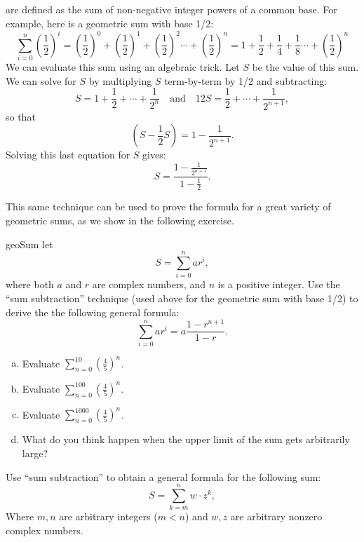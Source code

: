  are defined as the sum of non-negative integer powers of a common base.  For example, here is a geometric sum with base 1/2:
\[
\sum_{i=0}^{n}\left({\dfrac{1}{2}}\right)^i=\left({\dfrac{1}{2}}\right)^0+\left({\dfrac{1}{2}}\right)^1+\left({\dfrac{1}{2}}\right)^2\cdots +\left({\dfrac{1}{2}}\right)^n  = 1 + {\dfrac{1}{2}} + {\dfrac{1}{4}} + {\dfrac{1}{8}}\cdots +\left({\dfrac{1}{2}}\right)^n
\]
We can evaluate this sum using an algebraic trick.  Let $S$ be the value of this sum.  We can solve for $S$  by multiplying $S$ term-by-term by 1/2 and subtracting:
\[ S=1+\frac{1}{2}+ \cdots + \frac{1}{2^n} \quad \text{and} \quad
{1}{2}S=\frac{1}{2}+ \cdots + \frac{1}{2^{n+1}},
\]
so that
\[
\left(S - \frac{1}{2}S\right) = 1 - \frac{1}{2^{n+1}}.
\]
Solving this last equation for $S$ gives:
\[S=\dfrac{1 - \frac{1}{2^{n+1}}}{1-\frac{1}{2}}. \]

This same technique can be used to prove the formula for a great variety of geometric sums, as we show in the following exercise.

\begin{exercise}{geoSum}
let 
\[
S = \sum_{i=0}^{n} ar^i,
\]
where both $a$ and $r$ are complex numbers, and $n$ is a positive integer.
Use the ``sum subtraction'' technique (used above for the geometric sum with base 1/2) to derive the the following general formula:
\[ \sum_{i=0}^{n} ar^i = a \dfrac{1-r^{n+1}}{1-r}. \]
\end{exercise}

\begin{exercise}{}
\begin{enumerate}[(a)]
\item
Evaluate $\sum_{n=0}^{10} \left(\frac{4}{5}\right)^n$.
\item
Evaluate $\sum_{n=0}^{100} \left(\frac{4}{5}\right)^n$.
\item
Evaluate $\sum_{n=0}^{1000} \left(\frac{4}{5}\right)^n$.
\item
What do you think happen when the upper limit of the sum gets arbitrarily large?
\end{enumerate}
\end{exercise}

\begin{exercise}{}
Use ``sum subtraction'' to obtain a general formula for the following sum:
\[
S = \sum_{k=m}^{n} w\cdot z^k,
\]
Where $m,n$ are arbitrary integers ($m<n$) and $w,z$ are arbitrary nonzero complex numbers.
\end{exercise} 

